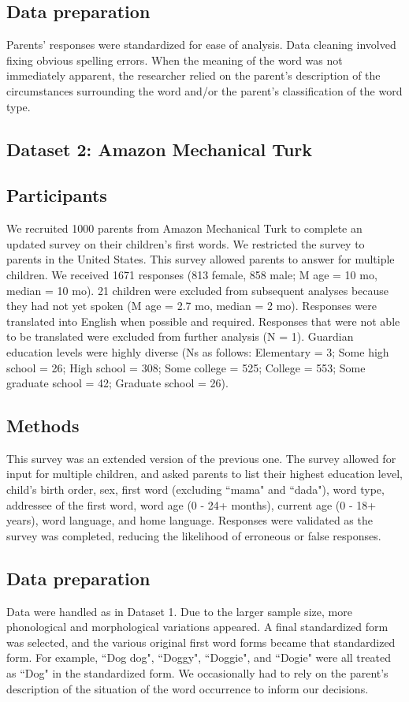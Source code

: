 \documentclass[10pt,letterpaper]{article}
\begin{document}
\subsection{Data preparation}
Parents' responses were standardized for ease of analysis. Data cleaning involved fixing obvious spelling errors. When the meaning of the word was not immediately apparent, the researcher relied on the parent's description of the circumstances surrounding the word and/or the parent's classification of the word type.

\subsection{Dataset 2: Amazon Mechanical Turk}

\subsection{Participants}
We recruited 1000 parents from Amazon Mechanical Turk to complete an updated survey on their children's first words. We restricted the survey to parents in the United States. This survey allowed parents to answer for multiple children. We received 1671 responses (813 female, 858 male; M age = 10 mo, median = 10 mo). 21 children were excluded from subsequent analyses because they had not yet spoken (M age = 2.7 mo, median = 2 mo). Responses were translated into English when possible and required. Responses that were not able to be translated were excluded from further analysis (N = 1). Guardian education levels were highly diverse (Ns as follows: Elementary = 3; Some high school = 26; High school = 308; Some college = 525; College = 553; Some graduate school = 42; Graduate school = 26). 

\subsection{Methods}
This survey was an extended version of the previous one. The survey allowed for input for multiple children, and asked parents to list their highest education level, child's birth order, sex,  first word (excluding ``mama" and ``dada"), word type, addressee of the first word, word age (0 - 24+ months), current age (0 - 18+ years), word language, and home language.  Responses were validated as the survey was completed, reducing the likelihood of erroneous or false responses. 

\subsection{Data preparation}
Data were handled as in Dataset 1. Due to the larger sample size, more phonological and morphological variations appeared. A final standardized form was selected, and the various original first word forms became that standardized form. For example,  ``Dog dog", ``Doggy", ``Doggie", and ``Dogie" were all treated as ``Dog" in the standardized form. We occasionally had to rely on the parent's description of the situation of the word occurrence to inform our decisions.
\end{document}
